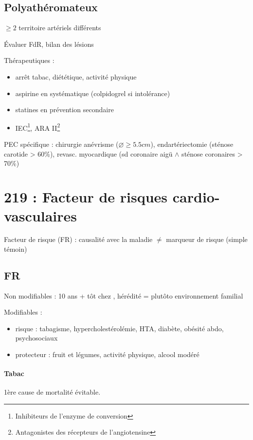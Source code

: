 \subsection{Polyathéromateux}

$\ge 2$ territoire artériels différents

Évaluer FdR, bilan des lésions

Thérapeutiques :
\begin{itemize}
  \item arrêt tabac, diététique, activité physique
  \item aspirine en systématique (colpidogrel si intolérance)
  \item statines en prévention secondaire
  \item IEC\footnote{Inhibiteurs de l'enzyme de conversion}, ARA
      II\footnote{Antagonistes des récepteurs de l'angiotensine}
\end{itemize}

PEC spécifique : chirurgie anévrisme ($\diameter \ge 5.5cm$), endartériectomie
(sténose carotide > 60\%), revasc. myocardique (sd coronaire aigü $\wedge$
sténose coronaires > 70\%)

\section{219 : Facteur de risques cardio-vasculaires}%
\label{sec:219_facteur_de_risques_cardio_vasculaires}

Facteur de risque (FR) : causalité avec la maladie $\neq$ marqueur de risque
(simple témoin)

\subsection{FR}
Non modifiables : 10 ans + tôt chez \male, hérédité = plutôto environnement
familial

Modifiables : 
\begin{itemize}
  \item risque : {tabagisme, hypercholestérolémie, HTA, diabète, obésité abdo,
    psychosociaux}
  \item protecteur : {fruit et légumes, activité physique, alcool modéré}
\end{itemize}

\paragraph{Tabac}
1ère cause de mortalité évitable.

